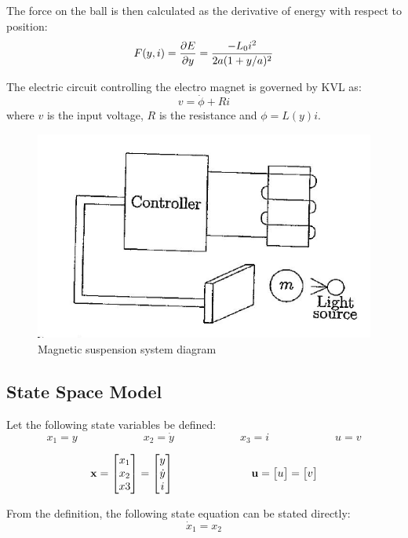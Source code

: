 \documentclass[letter]{article}
\begin{document}
	The force on the ball is then calculated as the derivative of energy with respect to position:
	\begin{equation}\label{eq:F_def}
		F(y,i) = \pdv{E}{y} = \frac{- L_0 i^2}{2 a (1+y/a)^2}
	\end{equation}
	
	The electric circuit controlling the electro magnet is governed by KVL as:
	\begin{equation}\label{eq:KVL_eq}
		v = \dot{\phi} + R i
	\end{equation}
	where $v$ is the input voltage, $R$ is the resistance and $\phi = L(y) i$.
	
	
	\begin{figure}[h]
		\centering
		\includegraphics[width=0.5\linewidth]{fig/pblm6_diagram}
		\caption{Magnetic suspension system diagram}
		\label{fig:pblm6diagram}
	\end{figure}


\newpage
\subsection{State Space Model}

Let the following state variables be defined:
$$x_1 = y \hspace{1in} x_2 = \dot{y} \hspace{1in} x_3 = i \hspace{1in} u = v$$

\begin{equation}\label{eq:state_vars}
	\centering
	\vb{x} = \mqty[x_1\\ x_2\\ x3] = \mqty[y\\ \dot{y} \\ i] \hspace{1in} \vb{u} = \mqty[u] = \mqty[v]
\end{equation}

From the definition, the following state equation can be stated directly:
\begin{equation}\label{eq:x1_dot_def}
	\dot{x}_1 = x_2
\end{equation}
\end{document}
